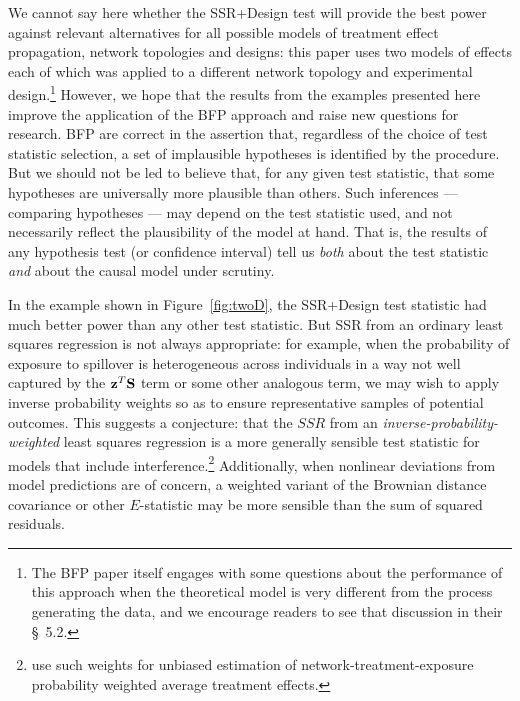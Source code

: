 We cannot say here whether the SSR+Design test will provide the best power
against relevant alternatives for all possible models of treatment effect
propagation, network topologies and designs: this paper uses two models of
effects each of which was applied to a different network topology and
experimental design.\footnote{The BFP paper itself engages with some questions about
the performance of this approach when the theoretical model is very different
from the process generating the data, and we encourage readers to see that
discussion in their \S~5.2.} However, we hope that the results from the
examples presented here improve the application of the BFP approach and raise new
questions for research.  BFP are correct in the assertion that, regardless of
the choice of test statistic selection, a set of implausible hypotheses is
identified by the procedure. But we should not be led to believe that, for any
given test statistic, that some hypotheses are universally more plausible than others.
Such inferences --- comparing hypotheses --- may depend on the test statistic
used, and not necessarily reflect the plausibility of the model at hand. That
is, the results of any hypothesis test (or confidence interval) tell
us \emph{both} about the test statistic \emph{and} about the causal model under scrutiny.

In the example shown in Figure~\ref{fig:twoD}, the SSR+Design test statistic had much better power than
any other test statistic. But SSR from an ordinary least squares regression is
not always appropriate: for example, when the probability of exposure to
spillover is heterogeneous across individuals in a way not well captured by the
$\mathbf{z}^T \mathbf{S}$ term or some other analogous term, we may wish to apply inverse
probability weights so as to ensure representative samples of potential
outcomes. This suggests a conjecture: that the $SSR$ from an
\emph{inverse-probability-weighted} least squares regression is a more generally
sensible test statistic for models that include
interference.\footnote{\citet{aronowsamii2012interfere} use such weights for
  unbiased estimation of network-treatment-exposure probability weighted
  average treatment effects.}  Additionally, when nonlinear deviations from
model predictions are of concern, a weighted variant of the Brownian distance
covariance \citep{szekely2009brownian} or other $E$-statistic may be more
sensible than the sum of squared residuals.


